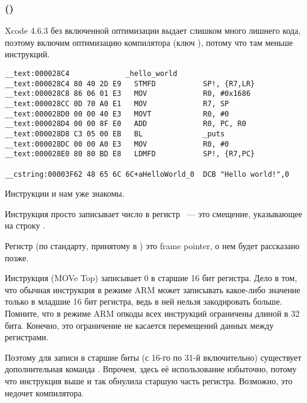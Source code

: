 \subsubsection{\OptimizingXcodeIV (\ARMMode)}

Xcode 4.6.3 без включенной оптимизации выдает слишком много лишнего кода, поэтому включим оптимизацию компилятора (ключ \Othree), потому что там меньше инструкций.

\begin{lstlisting}[caption=\OptimizingXcodeIV (\ARMMode),style=customasm]
__text:000028C4             _hello_world
__text:000028C4 80 40 2D E9   STMFD           SP!, {R7,LR}
__text:000028C8 86 06 01 E3   MOV             R0, #0x1686
__text:000028CC 0D 70 A0 E1   MOV             R7, SP
__text:000028D0 00 00 40 E3   MOVT            R0, #0
__text:000028D4 00 00 8F E0   ADD             R0, PC, R0
__text:000028D8 C3 05 00 EB   BL              _puts
__text:000028DC 00 00 A0 E3   MOV             R0, #0
__text:000028E0 80 80 BD E8   LDMFD           SP!, {R7,PC}

__cstring:00003F62 48 65 6C 6C+aHelloWorld_0  DCB "Hello world!",0
\end{lstlisting}

Инструкции  и  нам уже знакомы.

Инструкция \MOV просто записывает число  в регистр ~--- это смещение, указывающее на строку .

Регистр  (по стандарту, принятому в \IOSABI) это frame pointer, о нем будет рассказано позже.

Инструкция  (MOVe Top) записывает 0 в старшие 16 бит регистра.
Дело в том, что обычная инструкция \MOV в режиме ARM может записывать какое-либо значение только в младшие 16 бит регистра, ведь в ней нельзя закодировать больше.
Помните, что в режиме ARM опкоды всех инструкций ограничены длиной в 32 бита. Конечно, это ограничение не касается перемещений данных между регистрами.

Поэтому для записи в старшие биты (с 16-го по 31-й включительно) существует дополнительная команда .
Впрочем, здесь её использование избыточно, потому что инструкция  выше и так обнулила старшую часть регистра.
Возможно, это недочет компилятора.


